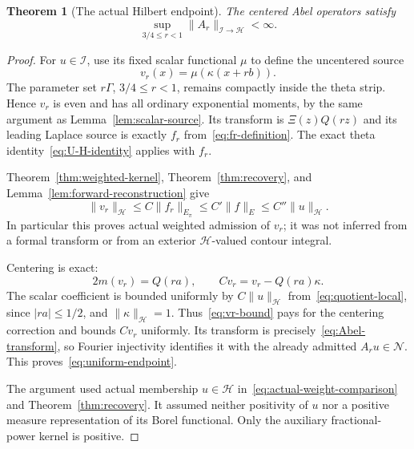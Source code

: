 \documentclass[11pt,a4paper]{article}
\numberwithin{equation}{section}
\newtheorem{theorem}{Theorem}[section]
\theoremstyle{definition}
\theoremstyle{remark}
\newcommand{\Hh}{\mathcal H}
\newcommand{\Nn}{\mathcal N}
\newcommand{\Ii}{\mathcal I}
\newcommand{\norm}[1]{\lVert #1\rVert}
\begin{document}
\begin{theorem}[The actual Hilbert endpoint]\label{thm:uniform-endpoint}
The centered Abel operators satisfy
\begin{equation}\label{eq:uniform-endpoint}
 \sup_{3/4\le r<1}\norm{A_r}_{\Ii\to\Hh}<\infty.
\end{equation}
\end{theorem}
\begin{proof}
For $u\in\Ii$, use its fixed scalar functional $\mu$ to define the uncentered source
\[
 v_r(x)=\mu(\kappa(x+rb)).
\]
The parameter set $r\Gamma$, $3/4\le r<1$, remains compactly inside the theta strip. Hence $v_r$ is even and has all ordinary exponential moments, by the same argument as Lemma~\ref{lem:scalar-source}. Its transform is $\Xi(z)Q(rz)$ and its leading Laplace source is exactly $f_r$ from~\eqref{eq:fr-definition}. The exact theta identity~\eqref{eq:U-H-identity} applies with $f_r$.

Theorem~\ref{thm:weighted-kernel}, Theorem~\ref{thm:recovery}, and Lemma~\ref{lem:forward-reconstruction} give
\begin{equation}\label{eq:vr-bound}
 \norm{v_r}_{\Hh}
 \le C\norm{f_r}_{E_\pi}
 \le C'\norm{f}_E
 \le C''\norm{u}_{\Hh}.
\end{equation}
In particular this proves actual weighted admission of $v_r$; it was not inferred from a formal transform or from an exterior $\Hh$-valued contour integral.

Centering is exact:
\[
 2m(v_r)=Q(ra),\qquad Cv_r=v_r-Q(ra)\kappa.
\]
The scalar coefficient is bounded uniformly by $C\norm{u}_{\Hh}$ from~\eqref{eq:quotient-local}, since $|ra|\le1/2$, and $\norm{\kappa}_{\Hh}=1$. Thus~\eqref{eq:vr-bound} pays for the centering correction and bounds $Cv_r$ uniformly. Its transform is precisely~\eqref{eq:Abel-transform}, so Fourier injectivity identifies it with the already admitted $A_ru\in\Nn$. This proves~\eqref{eq:uniform-endpoint}.

The argument used actual membership $u\in\Hh$ in~\eqref{eq:actual-weight-comparison} and Theorem~\ref{thm:recovery}. It assumed neither positivity of $u$ nor a positive measure representation of its Borel functional. Only the auxiliary fractional-power kernel is positive.
\end{proof}
\end{document}
